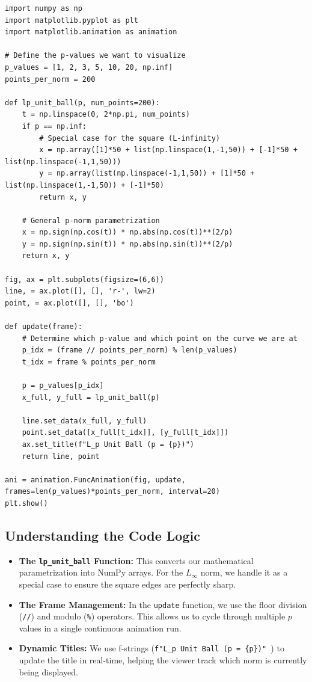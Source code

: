 \documentclass[12pt, a4paper]{report}
\begin{document}
\begin{lstlisting}[caption={Animating Equivalent Norms in $\mathbb{R}^2$}]
import numpy as np
import matplotlib.pyplot as plt
import matplotlib.animation as animation

# Define the p-values we want to visualize
p_values = [1, 2, 3, 5, 10, 20, np.inf]
points_per_norm = 200

def lp_unit_ball(p, num_points=200):
    t = np.linspace(0, 2*np.pi, num_points)
    if p == np.inf:
        # Special case for the square (L-infinity)
        x = np.array([1]*50 + list(np.linspace(1,-1,50)) + [-1]*50 + list(np.linspace(-1,1,50)))
        y = np.array(list(np.linspace(-1,1,50)) + [1]*50 + list(np.linspace(1,-1,50)) + [-1]*50)
        return x, y
    
    # General p-norm parametrization
    x = np.sign(np.cos(t)) * np.abs(np.cos(t))**(2/p)
    y = np.sign(np.sin(t)) * np.abs(np.sin(t))**(2/p)
    return x, y

fig, ax = plt.subplots(figsize=(6,6))
line, = ax.plot([], [], 'r-', lw=2)
point, = ax.plot([], [], 'bo')

def update(frame):
    # Determine which p-value and which point on the curve we are at
    p_idx = (frame // points_per_norm) % len(p_values)
    t_idx = frame % points_per_norm
    
    p = p_values[p_idx]
    x_full, y_full = lp_unit_ball(p)
    
    line.set_data(x_full, y_full)
    point.set_data([x_full[t_idx]], [y_full[t_idx]])
    ax.set_title(f"L_p Unit Ball (p = {p})")
    return line, point

ani = animation.FuncAnimation(fig, update, frames=len(p_values)*points_per_norm, interval=20)
plt.show()
\end{lstlisting}

\subsection{Understanding the Code Logic}
\begin{itemize}
    \item \textbf{The \texttt{lp\_unit\_ball} Function:} This converts our mathematical parametrization into NumPy arrays. For the $L_\infty$ norm, we handle it as a special case to ensure the square edges are perfectly sharp.
    \item \textbf{The Frame Management:} In the \texttt{update} function, we use the floor division (\texttt{//}) and modulo (\texttt{\%}) operators. This allows us to cycle through multiple $p$ values in a single continuous animation run.
    \item \textbf{Dynamic Titles:} We use f-strings (\texttt{f"L\_p Unit Ball (p = \{p\})" }) to update the title in real-time, helping the viewer track which norm is currently being displayed.
\end{itemize}
\end{document}
